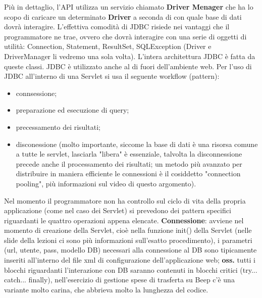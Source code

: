 Più in dettaglio, l'API utilizza un servizio chiamato \textbf{Driver Menager} che ha lo scopo di caricare un determinato \textbf{Driver} a seconda di con quale base di dati dovrà interagire.\newline
\newline
L'effettiva comodità di JDBC risiede nei vantaggi che il programmatore ne trae, ovvero che dovrà interagire con una serie di oggetti di utilità: Connection, Statement, ResultSet, SQLException (Driver e DriverManager li vedremo una sola volta). L'intera architettura JDBC è fatta da queste classi.\newline
\newline
JDBC è utilizzato anche al di fuori dell'ambiente web.\newline
\newline
Per l'uso di JDBC all'interno di una Servlet si usa il seguente workflow (pattern):
\begin{itemize}
    \item connsessione;
    \item preparazione ed esecuzione di query;
    \item precessamento dei risultati;
    \item disconessione (molto importante, siccome la base di dati è una risorsa comune a tutte le servlet, lasciarla "libera" è essenziale, talvolta la disconnessione precede anche il processamento dei risultati; un metodo più avanzato per distribuire in maniera efficiente le connessioni è il cosiddetto "connection pooling", più informazioni sul video di questo argomento).
\end{itemize}
Nel momento il programmatore non ha controllo sul ciclo di vita della propria applicazione (come nel caso dei Servlet) si prevedono dei pattern specifici riguardanti le quattro operazioni appena elencate.\newline
\textbf{Connessione}: avviene nel momento di creazione della Servlet, cioè nella funzione init() della Servlet (nelle slide della lezioni ci sono più informazioni sull'esatto procedimento), i parametri (url, utente, pass, modello DB) necessari alla connessione al DB sono tipicamente inseriti all'interno del file xml di configurazione dell'applicazione web;\newline
\textbf{oss.} tutti i blocchi riguardanti l'interazione con DB saranno contenuti in blocchi critici (try... catch... finally), nell'esercizio di gestione spese di trasferta su Beep c'è una variante molto carina, che abbrieva molto la lunghezza del codice.\newline
